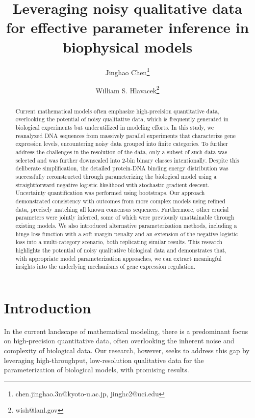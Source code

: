 \documentclass{article}
\title{Leveraging noisy qualitative data for effective parameter inference in biophysical models}
\date{}
\author[1,2]{Jinghao Chen\thanks{chen.jinghao.3n@kyoto-u.ac.jp, jinghc2@uci.edu}}
\author[3]{William S. Hlavacek\thanks{wish@lanl.gov}}
\date{}
\affil[1]{\small Institute for the Advanced Study of Human Biology, Kyoto University, Japan}
\affil[2]{Department of Mathematics, University of California, Irvine, USA}
\affil[3]{Theoretical Division, Los Alamos National Laboratory, USA}
\begin{document}
\maketitle

\begin{abstract}
    Current mathematical models often emphasize high-precision quantitative data, overlooking the potential of noisy qualitative data, which is frequently generated in biological experiments but underutilized in modeling efforts. In this study, we reanalyzed DNA sequences from massively parallel experiments that characterize gene expression levels, encountering noisy data grouped into finite categories. To further address the challenges in the resolution of the data, only a subset of such data was selected and was further downscaled into 2-bin binary classes intentionally. Despite this deliberate simplification, the detailed protein-DNA binding energy distribution was successfully reconstructed through parameterizing the biological model using a straightforward negative logistic likelihood with stochastic gradient descent. Uncertainty quantification was performed using bootstraps. Our approach demonstrated consistency with outcomes from more complex models using refined data, precisely matching all known consensus sequences. Furthermore, other crucial parameters were jointly inferred, some of which were previously unattainable through existing models. We also introduced alternative parameterization methods, including a hinge loss function with a soft margin penalty and an extension of the negative logistic loss into a multi-category scenario, both replicating similar results. This research highlights the potential of noisy qualitative biological data and demonstrates that, with appropriate model parameterization approaches, we can extract meaningful insights into the underlying mechanisms of gene expression regulation.
\end{abstract}

\newpage
\tableofcontents

\newpage
\section{Introduction}

In the current landscape of mathematical modeling, there is a predominant focus on high-precision quantitative data, often overlooking the inherent noise and complexity of biological data. Our research, however, seeks to address this gap by leveraging high-throughput, low-resolution qualitative data for the parameterization of biological models, with promising results.
\end{document}
